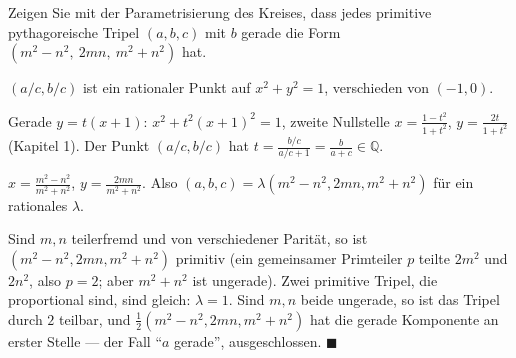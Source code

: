 \begin{aufgabe}
Zeigen Sie mit der Parametrisierung des Kreises, dass jedes primitive pythagoreische Tripel $(a, b, c)$ mit $b$ gerade die Form $(m^{2} - n^{2},\ 2mn,\ m^{2} + n^{2})$ hat.

\loesung
{}
$(a/c, b/c)$ ist ein rationaler Punkt auf $x^{2} + y^{2} = 1$, verschieden von $(-1, 0)$.

Gerade $y = t(x + 1)$: $x^{2} + t^{2}(x + 1)^{2} = 1$, zweite Nullstelle $x = \frac{1 - t^{2}}{1 + t^{2}}$, $y = \frac{2t}{1 + t^{2}}$ (Kapitel 1). Der Punkt $(a/c, b/c)$ hat $t = \frac{b/c}{a/c + 1} = \frac{b}{a + c}\in\mathbb Q$.

$x = \frac{m^{2} - n^{2}}{m^{2} + n^{2}}$, $y = \frac{2mn}{m^{2} + n^{2}}$. Also $(a, b, c) = \lambda(m^{2} - n^{2}, 2mn, m^{2} + n^{2})$ für ein rationales $\lambda$.

Sind $m, n$ teilerfremd und von verschiedener Parität, so ist $(m^{2} - n^{2}, 2mn, m^{2} + n^{2})$ primitiv (ein gemeinsamer Primteiler $p$ teilte $2m^{2}$ und $2n^{2}$, also $p = 2$; aber $m^{2} + n^{2}$ ist ungerade). Zwei primitive Tripel, die proportional sind, sind gleich: $\lambda = 1$. Sind $m, n$ beide ungerade, so ist das Tripel durch $2$ teilbar, und $\tfrac12(m^{2} - n^{2}, 2mn, m^{2} + n^{2})$ hat die gerade Komponente an erster Stelle --- der Fall \enquote{$a$ gerade}, ausgeschlossen. $\blacksquare$

\begin{center}
\begin{minipage}{0.88\textwidth}
\end{minipage}
\end{center}
\end{aufgabe}

